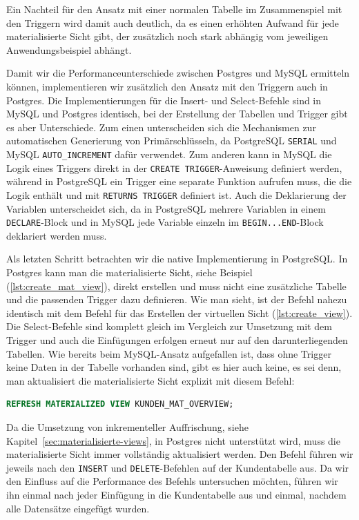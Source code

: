 Ein Nachteil für den Ansatz mit einer normalen Tabelle im Zusammenspiel mit den Triggern wird damit auch deutlich, da es einen erhöhten Aufwand für jede materialisierte Sicht gibt, der zusätzlich noch stark abhängig vom jeweiligen Anwendungsbeispiel abhängt.

Damit wir die Performanceunterschiede zwischen Postgres und MySQL ermitteln können, implementieren wir zusätzlich den Ansatz mit den Triggern auch in Postgres.
Die Implementierungen für die Insert- und Select-Befehle sind in MySQL und Postgres identisch, bei der Erstellung der Tabellen und Trigger gibt es aber Unterschiede.
Zum einen unterscheiden sich die Mechanismen zur automatischen Generierung von Primärschlüsseln, da PostgreSQL \texttt{SERIAL} und MySQL \texttt{AUTO\_INCREMENT} dafür verwendet.
Zum anderen kann in MySQL die Logik eines Triggers direkt in der \texttt{CREATE TRIGGER}-Anweisung definiert werden, während in PostgreSQL ein Trigger eine separate Funktion aufrufen muss, die die Logik enthält und mit \texttt{RETURNS TRIGGER} definiert ist.
Auch die Deklarierung der Variablen unterscheidet sich, da in PostgreSQL mehrere Variablen in einem \texttt{DECLARE}-Block und in MySQL jede Variable einzeln im \texttt{BEGIN...END}-Block deklariert werden muss.

Als letzten Schritt betrachten wir die native Implementierung in PostgreSQL\@.
In Postgres kann man die materialisierte Sicht, siehe Beispiel (\ref{lst:create_mat_view}), direkt erstellen und muss nicht eine zusätzliche Tabelle und die passenden Trigger dazu definieren.
Wie man sieht, ist der Befehl nahezu identisch mit dem Befehl für das Erstellen der virtuellen Sicht (\ref{lst:create_view}).
Die Select-Befehle sind komplett gleich im Vergleich zur Umsetzung mit dem Trigger und auch die Einfügungen erfolgen erneut nur auf den darunterliegenden Tabellen.
Wie bereits beim MySQL-Ansatz aufgefallen ist, dass ohne Trigger keine Daten in der Tabelle vorhanden sind, gibt es hier auch keine, es sei denn, man aktualisiert die materialisierte Sicht explizit mit diesem Befehl:

\vspace{-5pt}
\begin{lstlisting}[language=SQL,caption=Aktualisierung der materialisierten Sicht,label={lst:refresh-materialized-view}]
REFRESH MATERIALIZED VIEW KUNDEN_MAT_OVERVIEW;
\end{lstlisting}
\vspace{-5pt}

Da die Umsetzung von inkrementeller Auffrischung, siehe Kapitel~\ref{sec:materialisierte-views}, in Postgres nicht unterstützt wird, muss die materialisierte Sicht immer vollständig aktualisiert werden.
Den Befehl führen wir jeweils nach den \texttt{INSERT} und \texttt{DELETE}-Befehlen auf der Kundentabelle aus.
Da wir den Einfluss auf die Performance des Befehls untersuchen möchten, führen wir ihn einmal nach jeder Einfügung in die Kundentabelle aus und einmal, nachdem alle Datensätze eingefügt wurden.

